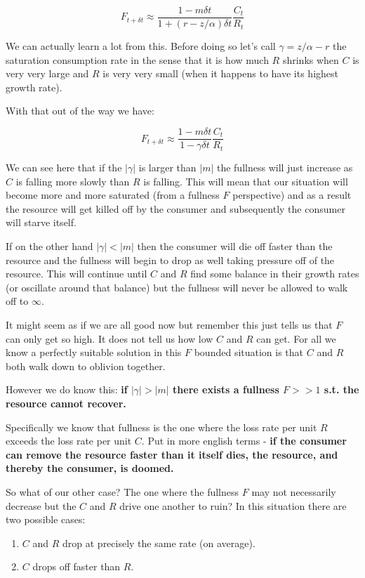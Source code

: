 \documentclass[11pt,a5paper]{book}
\begin{document}
$$F_{t+\delta t} \approx \frac{1-m\delta t}{1 + (r-z/\alpha)\delta t}\frac{C_t}{R_t}$$

We can actually learn a lot from this. Before doing so let's call $\gamma=z/\alpha-r$ the saturation consumption rate in the sense that it is how much $R$ shrinks when $C$ is very very large and $R$ is very very small (when it happens to have its highest growth rate). 

With that out of the way we have:

$$F_{t+\delta t} \approx \frac{1-m\delta t}{1 - \gamma \delta t}\frac{C_t}{R_t}$$

We can see here that if the $|\gamma|$ is larger than $|m|$ the fullness will just increase as $C$ is falling more slowly than $R$ is falling. This will mean that our situation will become more and more saturated (from a fullness $F$ perspective) and as a result the resource will get killed off by the consumer and subsequently the consumer will starve itself. 

If on the other hand $|\gamma| < |m|$ then the consumer will die off faster than the resource and the fullness will begin to drop as well taking pressure off of the resource. This will continue until $C$ and $R$ find some balance in their growth rates (or oscillate around that balance) but the fullness will never be allowed to walk off to $\infty$. 

It might seem as if we are all good now but remember this just tells us that $F$ can only get so high. It does not tell us how low $C$ and $R$ can get. For all we know a perfectly suitable solution in this $F$ bounded situation is that $C$ and $R$ both walk down to oblivion together. 
\newline

However we do know this: \textbf{if $|\gamma| > |m|$ there exists a fullness $F>>1$ s.t. the resource cannot recover.}

Specifically we know that fullness is the one where the loss rate per unit $R$ exceeds the loss rate per unit $C$. Put in more english terms - \textbf{if the consumer can remove the resource faster than it itself dies, the resource, and thereby the consumer, is doomed.} 
\newline 

So what of our other case? The one where the fullness $F$ may not necessarily decrease but the $C$ and $R$ drive one another to ruin? In this situation there are two possible cases:

\begin{enumerate}
\item $C$ and $R$ drop at precisely the same rate (on average).
\item $C$ drops off faster than $R$. 
\end{enumerate}
\end{document}
